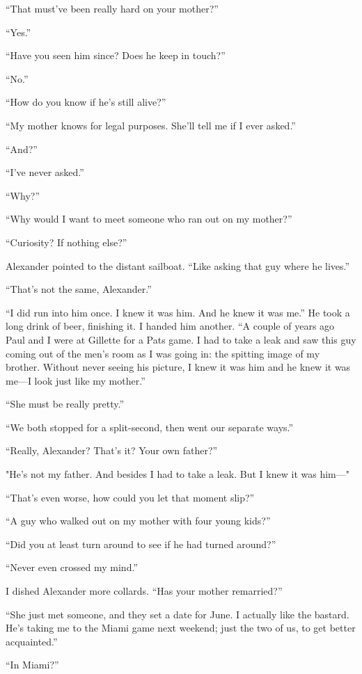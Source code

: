 ``That must've been really hard on your mother?''

``Yes.''

``Have you seen him since? Does he keep in touch?''

``No.''

``How do you know if he's still alive?''

``My mother knows for legal purposes. She'll tell me if I ever asked.''

``And?''

``I've never asked.''

``Why?''

``Why would I want to meet someone who ran out on my mother?''

``Curiosity? If nothing else?''

Alexander pointed to the distant sailboat. ``Like asking that guy where
he lives.''

``That's not the same, Alexander.''

``I did run into him once. I knew it was him. And he knew it was me.''
He took a long drink of beer, finishing it. I handed him another. ``A
couple of years ago Paul and I were at Gillette for a Pats game. I had
to take a leak and saw this guy coming out of the men's room as I was
going in: the spitting image of my brother. Without never seeing his
picture, I knew it was him and he knew it was me---I look just like my
mother.''

``She must be really pretty.''

``We both stopped for a split-second, then went our separate ways.''

``Really, Alexander? That's it? Your own father?''

"He's not my father. And besides I had to take a leak. But I knew it was
him---"

``That's even worse, how could you let that moment slip?''

``A guy who walked out on my mother with four young kids?''

``Did you at least turn around to see if he had turned around?''

``Never even crossed my mind.''

I dished Alexander more collards. ``Has your mother remarried?''

``She just met someone, and they set a date for June. I actually like
the bastard. He's taking me to the Miami game next weekend; just the two
of us, to get better acquainted.''

``In Miami?''

